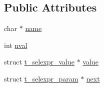\subsection*{\-Public \-Attributes}
\begin{DoxyCompactItemize}
\item 
char $\ast$ \hyperlink{structt__selexpr__param_a0522622f9261b8bc183b4813a15f3f56}{name}
\item 
int \hyperlink{structt__selexpr__param_a53d38ffb62c39877c3033b4b43a1358a}{nval}
\item 
struct \hyperlink{structt__selexpr__value}{t\-\_\-selexpr\-\_\-value} $\ast$ \hyperlink{structt__selexpr__param_a7d4a06d62902cdb7fe32e313b0186695}{value}
\item 
struct \hyperlink{structt__selexpr__param}{t\-\_\-selexpr\-\_\-param} $\ast$ \hyperlink{structt__selexpr__param_a81a614b1b510f114278bb6de496e8a16}{next}
\end{DoxyCompactItemize}


